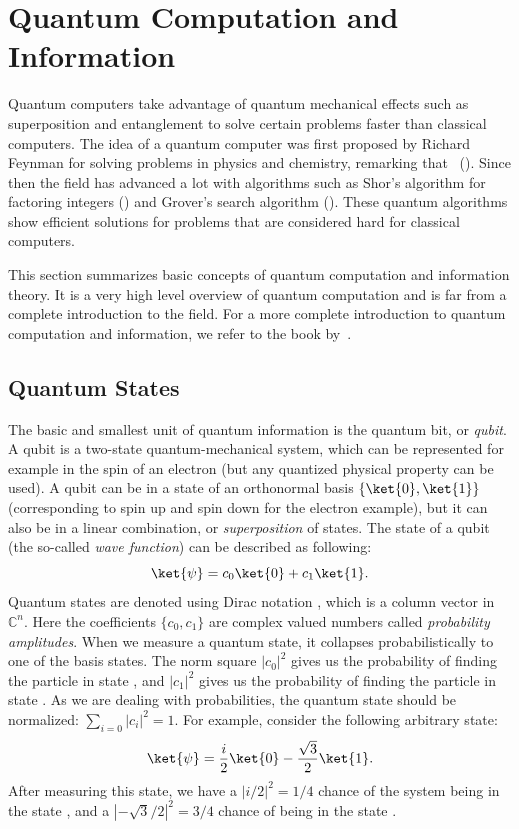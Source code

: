 \documentclass[a4paper,10pt]{article}
\begin{document}
\section{Quantum Computation and Information} \label{sec:quantum-computation-information}
Quantum computers take advantage of quantum mechanical effects such as superposition and entanglement to solve certain problems faster than classical computers.
The idea of a quantum computer was first proposed by Richard Feynman for solving problems in physics and chemistry, remarking that ~(\cite{feynman-simulating}).
Since then the field has advanced a lot with algorithms such as Shor's algorithm for factoring integers (\cite{shor-factoring}) and Grover's search algorithm (\cite{grover-search}).
These quantum algorithms show efficient solutions for problems that are considered hard for classical computers.

This section summarizes basic concepts of quantum computation and information theory.
It is a very high level overview of quantum computation and is far from a complete introduction to the field.
For a more complete introduction to quantum computation and information, we refer to the book by~\cite{nielsen-chuang}.

\subsection{Quantum States}
The basic and smallest unit of quantum information is the quantum bit, or \emph{qubit}.
A qubit is a two-state quantum-mechanical system, which can be represented for example in the spin of an electron (but any quantized physical property can be used).
A qubit can be in a state of an orthonormal basis $\{\ket{0}, \ket{1}\}$ (corresponding to spin up and spin down for the electron example), but it can also be in a linear combination, or \emph{superposition} of states.
The state of a qubit (the so-called \emph{wave function}) can be described as following:
\begin{equation}
\ket{\psi} = c_0\ket{0} + c_1\ket{1}.
\end{equation}
Quantum states are denoted using Dirac notation \ket{\,\cdotp\,}, which is a column vector in $\mathbb{C}^n$.
Here the coefficients $\{c_0, c_1\}$ are complex valued numbers called \emph{probability amplitudes}.
When we measure a quantum state, it collapses probabilistically to one of the basis states.
The norm square $|c_0|^2$ gives us the probability of finding the particle in state , and $|c_1|^2$ gives us the probability of finding the particle in state .
As we are dealing with probabilities, the quantum state should be normalized: $\sum_{i=0}|c_i|^2 = 1$.
For example, consider the following arbitrary state:
\begin{equation}
\ket{\psi} = \dfrac{i}{2}\ket{0} - \dfrac{\sqrt3}{2}\ket{1}.
\end{equation}
After measuring this state, we have a $|i/2|^2 = 1/4$ chance of the system being in the state , and a $|{-}\sqrt3/2|^2 = 3/4$ chance of being in the state .
\end{document}
